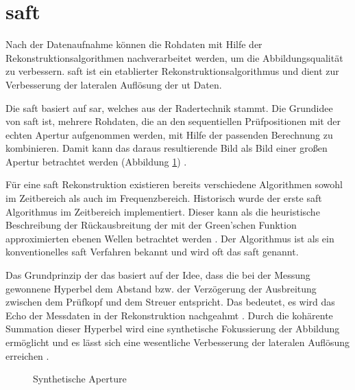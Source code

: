 \section{\acrfull{saft}}\label{sec:saft_general}%
Nach der Datenaufnahme können die Rohdaten mit Hilfe der Rekonstruktionsalgorithmen nachverarbeitet werden, um die Abbildungsqualität zu verbessern. \acrfull{saft} ist ein etablierter Rekonstruktionsalgorithmus und dient zur Verbesserung der lateralen Auflösung der \acrshort{ut} Daten. \par
Die \acrshort{saft} basiert auf \acrfull{sar}, welches aus der Radertechnik stammt. Die Grundidee von \acrshort{saft} ist, mehrere Rohdaten, die an den sequentiellen Prüfpositionen mit der echten Apertur aufgenommen werden, mit Hilfe der passenden Berechnung zu kombinieren. Damit kann das daraus resultierende Bild als Bild einer großen Apertur betrachtet werden (Abbildung \ref{fig:synthetic_aperture}) \cite{Lingvall04PhD}. \par
Für eine \acrshort{saft} Rekonstruktion existieren bereits verschiedene Algorithmen sowohl im Zeitbereich als auch im Frequenzbereich. Historisch wurde der erste \acrshort{saft} Algorithmus im Zeitbereich implementiert. Dieser kann als die heuristische Beschreibung der Rückausbreitung der mit der Green'schen Funktion approximierten ebenen Wellen betrachtet werden \cite{Krieg15MA}. Der Algorithmus ist als ein konventionelles \acrshort{saft} Verfahren bekannt und wird oft \acrfull{das} \acrshort{saft} genannt. \par
Das Grundprinzip der \acrshort{das} basiert auf der Idee, dass die bei der Messung gewonnene Hyperbel dem Abstand bzw. der Verzögerung der Ausbreitung zwischen dem Prüfkopf und dem Streuer entspricht. Das bedeutet, es wird das Echo der Messdaten in der Rekonstruktion nachgeahmt \cite{Lingvall04PhD}. Durch die kohärente Summation dieser Hyperbel wird eine synthetische Fokussierung der Abbildung ermöglicht und es lässt sich eine wesentliche Verbesserung der lateralen Auflösung erreichen \cite{Lingvall04PhD} \cite{Lingvall03SAIwithDeconvolution} \cite{Stepinski10SAFTreview}. \par

\begin{figure}[h!]
\begin{center}
\caption{Synthetische Aperture}
\label{fig:synthetic_aperture}
\end{center}
\end{figure}

